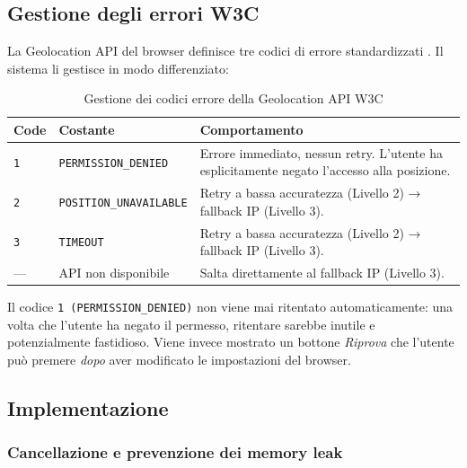 \documentclass[12pt, a4paper]{article}
\begin{document}
\subsection{Gestione degli errori W3C}

La Geolocation API del browser definisce tre codici di errore standardizzati
\cite{w3c-geolocation}. Il sistema li gestisce in modo differenziato:

\begin{table}[h!]
  \centering
  \caption{Gestione dei codici errore della Geolocation API W3C}
  \begin{tabularx}{\linewidth}{C{1.2cm} L{3.8cm} L{7.5cm}}
    \toprule
    \textbf{Code} & \textbf{Costante} & \textbf{Comportamento} \\
    \midrule
    \texttt{1} & \texttt{PERMISSION\_DENIED}      & Errore immediato, nessun retry. L'utente ha esplicitamente negato l'accesso alla posizione. \\
    \addlinespace
    \texttt{2} & \texttt{POSITION\_UNAVAILABLE}   & Retry a bassa accuratezza (Livello 2) → fallback IP (Livello 3). \\
    \addlinespace
    \texttt{3} & \texttt{TIMEOUT}                 & Retry a bassa accuratezza (Livello 2) → fallback IP (Livello 3). \\
    \addlinespace
    —          & API non disponibile              & Salta direttamente al fallback IP (Livello 3). \\
    \bottomrule
  \end{tabularx}
\end{table}

\begin{notebox}
Il codice \texttt{1 (PERMISSION\_DENIED)} non viene mai ritentato
automaticamente: una volta che l'utente ha negato il permesso, ritentare
sarebbe inutile e potenzialmente fastidioso. Viene invece mostrato un bottone
\textit{Riprova} che l'utente può premere \emph{dopo} aver modificato le
impostazioni del browser.
\end{notebox}

\subsection{Implementazione}

\subsubsection{Cancellazione e prevenzione dei memory leak}
\end{document}
